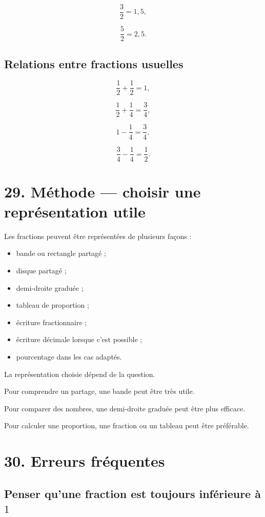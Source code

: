 \[
\dfrac{3}{2}=1{,}5,
\]

\[
\dfrac{5}{2}=2{,}5.
\]

\subsection{Relations entre fractions usuelles}

\[
\dfrac{1}{2}+\dfrac{1}{2}=1,
\]

\[
\dfrac{1}{2}+\dfrac{1}{4}=\dfrac{3}{4},
\]

\[
1-\dfrac{1}{4}=\dfrac{3}{4},
\]

\[
\dfrac{3}{4}-\dfrac{1}{4}=\dfrac{1}{2}.
\]

\section{29. Méthode — choisir une représentation utile}

Les fractions peuvent être représentées de plusieurs façons :

\begin{itemize}
\item bande ou rectangle partagé ;
\item disque partagé ;
\item demi-droite graduée ;
\item tableau de proportion ;
\item écriture fractionnaire ;
\item écriture décimale lorsque c’est possible ;
\item pourcentage dans les cas adaptés.
\end{itemize}

La représentation choisie dépend de la question.

Pour comprendre un partage, une bande peut être très utile.

Pour comparer des nombres, une demi-droite graduée peut être plus efficace.

Pour calculer une proportion, une fraction ou un tableau peut être préférable.

\section{30. Erreurs fréquentes}

\subsection{Penser qu’une fraction est toujours inférieure à $1$}


